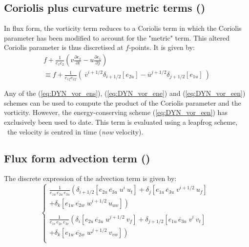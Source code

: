\documentclass[../main/NEMO_manual]{subfiles}
\begin{document}
\subsection[Coriolis plus curvature metric terms (\textit{dynvor.F90})]{Coriolis plus curvature metric terms (\protect{})}
\label{subsec:DYN_cor_flux}

In flux form, the vorticity term reduces to a Coriolis term in which the Coriolis parameter has been modified to account for the "metric" term.
This altered Coriolis parameter is thus discretised at $f$-points.
It is given by:
\begin{multline*}
  f+\frac{1}{e_1 e_2 }\left( {v\frac{\partial e_2 }{\partial i}  -  u\frac{\partial e_1 }{\partial j}} \right)  \\
  \equiv   f + \frac{1}{e_{1f} e_{2f} } \left( { \ \overline v ^{i+1/2}\delta_{i+1/2} \left[ {e_{2u} } \right]
      -  \overline u ^{j+1/2}\delta_{j+1/2} \left[ {e_{1u} } \right]  }  \ \right)
\end{multline*}

Any of the (\autoref{eq:DYN_vor_ens}), (\autoref{eq:DYN_vor_ene}) and (\autoref{eq:DYN_vor_een}) schemes can be used to
compute the product of the Coriolis parameter and the vorticity.
However, the energy-conserving scheme (\autoref{eq:DYN_vor_een}) has exclusively been used to date.
This term is evaluated using a leapfrog scheme, \ie\ the velocity is centred in time (\textit{now} velocity).

\subsection[Flux form advection term (\textit{dynadv.F90})]{Flux form advection term (\protect{})}
\label{subsec:DYN_adv_flux}

The discrete expression of the advection term is given by:
\[
  \left\{
    \begin{aligned}
      \frac{1}{e_{1u}\,e_{2u}\,e_{3u}}
      \left(      \delta_{i+1/2} \left[ \overline{e_{2u}\,e_{3u}\;u }^{i       }  \ u_t      \right]
        + \delta_{j       } \left[ \overline{e_{1u}\,e_{3u}\;v }^{i+1/2}  \ u_f      \right] \right.  \ \;   \\
      \left.   + \delta_{k      } \left[ \overline{e_{1w}\,e_{2w}\;w}^{i+1/2}  \ u_{uw} \right] \right)   \\
      \\
      \frac{1}{e_{1v}\,e_{2v}\,e_{3v}}
      \left(     \delta_{i       } \left[ \overline{e_{2u}\,e_{3u }\;u }^{j+1/2} \ v_f       \right]
        + \delta_{j+1/2} \left[ \overline{e_{1u}\,e_{3u }\;v }^{i       } \ v_t       \right] \right.  \ \, \, \\
      \left.  + \delta_{k      } \left[ \overline{e_{1w}\,e_{2w}\;w}^{j+1/2} \ v_{vw}  \right] \right) \\
    \end{aligned}
  \right.
\]
\end{document}
